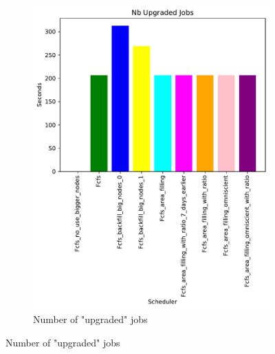 \documentclass[a4paper]{article}
\begin{document}
\begin{figure}[H]
\begin{subfigure}[b]{0.4\linewidth}\centering\includegraphics[width=0.95\linewidth]{MBSS/plot/Size_Constraint_2022-01-17->2022-01-17_V85105_Nb_Upgraded_Jobs_450_128_32_256_4_1024.pdf}\caption{Number of "upgraded" jobs}\label{45}\end{subfigure}

\end{figure}
\end{document}

